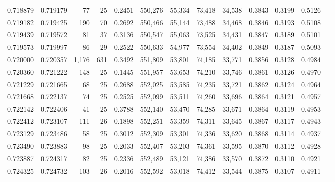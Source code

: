 \begin{tabular}{rrrrrrrrrrrrr}
0.718879 & 0.719179 &    77 &  25 &                                     0.2451 & 550,276 &  55,334 &  73,418 &  34,538 & 0.3843 & 0.3199 & 0.5126 \\
0.719182 & 0.719425 &   190 &  70 &                                     0.2692 & 550,466 &  55,144 &  73,488 &  34,468 & 0.3846 & 0.3193 & 0.5108 \\
0.719439 & 0.719572 &    81 &  37 &                                     0.3136 & 550,547 &  55,063 &  73,525 &  34,431 & 0.3847 & 0.3189 & 0.5101 \\
0.719573 & 0.719997 &    86 &  29 &                                     0.2522 & 550,633 &  54,977 &  73,554 &  34,402 & 0.3849 & 0.3187 & 0.5093 \\
0.720000 & 0.720357 & 1,176 & 631 &                                     0.3492 & 551,809 &  53,801 &  74,185 &  33,771 & 0.3856 & 0.3128 & 0.4984 \\
0.720360 & 0.721222 &   148 &  25 &                                     0.1445 & 551,957 &  53,653 &  74,210 &  33,746 & 0.3861 & 0.3126 & 0.4970 \\
0.721229 & 0.721665 &    68 &  25 &                                     0.2688 & 552,025 &  53,585 &  74,235 &  33,721 & 0.3862 & 0.3124 & 0.4964 \\
0.721668 & 0.722137 &    74 &  25 &                                     0.2525 & 552,099 &  53,511 &  74,260 &  33,696 & 0.3864 & 0.3121 & 0.4957 \\
0.722142 & 0.722406 &    41 &  25 &                                     0.3788 & 552,140 &  53,470 &  74,285 &  33,671 & 0.3864 & 0.3119 & 0.4953 \\
0.722412 & 0.723107 &   111 &  26 &                                     0.1898 & 552,251 &  53,359 &  74,311 &  33,645 & 0.3867 & 0.3117 & 0.4943 \\
0.723129 & 0.723486 &    58 &  25 &                                     0.3012 & 552,309 &  53,301 &  74,336 &  33,620 & 0.3868 & 0.3114 & 0.4937 \\
0.723490 & 0.723883 &    98 &  25 &                                     0.2033 & 552,407 &  53,203 &  74,361 &  33,595 & 0.3870 & 0.3112 & 0.4928 \\
0.723887 & 0.724317 &    82 &  25 &                                     0.2336 & 552,489 &  53,121 &  74,386 &  33,570 & 0.3872 & 0.3110 & 0.4921 \\
0.724325 & 0.724732 &   103 &  26 &                                     0.2016 & 552,592 &  53,018 &  74,412 &  33,544 & 0.3875 & 0.3107 & 0.4911 \\

\end{tabular}
